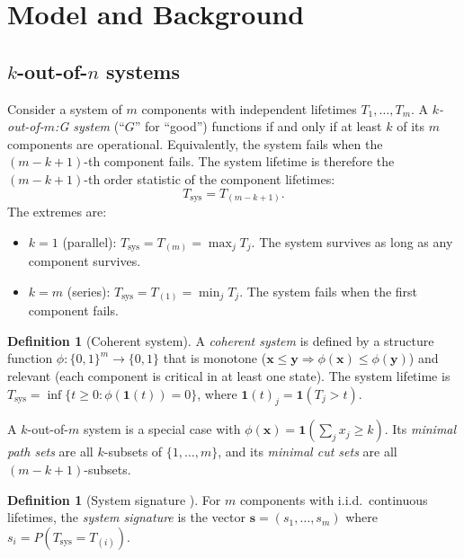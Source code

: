 \documentclass[12pt]{article}
\theoremstyle{definition}
\newtheorem{definition}[theorem]{Definition}
\theoremstyle{remark}
\newcommand{\bone}{\mathbf{1}}
\begin{document}
\section{Model and Background}
\label{sec:model}

\subsection{\texorpdfstring{$k$}{k}-out-of-\texorpdfstring{$n$}{n} systems}
\label{sec:kofn}

Consider a system of $m$ components with independent lifetimes
$T_1, \ldots, T_m$.  A \emph{$k$-out-of-$m$:G system} (``$G$'' for
``good'') functions if and only if at least $k$ of its $m$ components
are operational.  Equivalently, the system fails when the $(m - k +
1)$-th component fails.  The system lifetime is therefore the
$(m - k + 1)$-th order statistic of the component lifetimes:
\begin{equation}
  \label{eq:Tsys}
  T_{\mathrm{sys}} = T_{(m-k+1)}.
\end{equation}
The extremes are:
\begin{itemize}
  \item $k = 1$ (parallel): $T_{\mathrm{sys}} = T_{(m)} = \max_j T_j$.
    The system survives as long as any component survives.
  \item $k = m$ (series): $T_{\mathrm{sys}} = T_{(1)} = \min_j T_j$.
    The system fails when the first component fails.
\end{itemize}

\begin{definition}[Coherent system]
  \label{def:coherent}
  A \emph{coherent system} is defined by a structure function
  $\phi: \{0,1\}^m \to \{0,1\}$ that is monotone
  ($\mathbf{x} \le \mathbf{y} \Rightarrow \phi(\mathbf{x}) \le
  \phi(\mathbf{y})$) and relevant (each component is critical in at
  least one state).  The system lifetime is
  $T_{\mathrm{sys}} = \inf\{t \ge 0 : \phi(\bone(t)) = 0\}$, where
  $\bone(t)_j = \mathbf{1}(T_j > t)$.
\end{definition}

A $k$-out-of-$m$ system is a special case with
$\phi(\mathbf{x}) = \mathbf{1}(\sum_j x_j \ge k)$.  Its
\emph{minimal path sets} are all $k$-subsets of $\{1, \ldots, m\}$,
and its \emph{minimal cut sets} are all $(m - k + 1)$-subsets.

\begin{definition}[System signature {\citep{Samaniego1985}}]
  \label{def:signature}
  For $m$ components with i.i.d.\ continuous lifetimes, the
  \emph{system signature} is the vector
  $\mathbf{s} = (s_1, \ldots, s_m)$ where
  $s_i = P(T_{\mathrm{sys}} = T_{(i)})$.
\end{definition}
\end{document}
